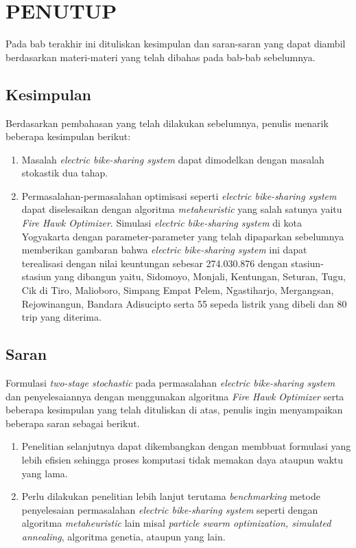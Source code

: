 \chapter{PENUTUP}

Pada bab terakhir ini dituliskan kesimpulan dan saran-saran yang dapat diambil berdasarkan materi-materi yang telah dibahas pada bab-bab sebelumnya.

\section{Kesimpulan}
Berdasarkan pembahasan yang telah dilakukan sebelumnya, penulis menarik beberapa kesimpulan berikut:
\begin{enumerate}
    \item Masalah \textit{electric bike-sharing system} dapat dimodelkan dengan masalah stokastik dua tahap.
    \item Permasalahan-permasalahan optimisasi seperti \textit{electric bike-sharing system} dapat diselesaikan dengan algoritma \textit{metaheuristic} yang salah satunya yaitu \textit{Fire Hawk Optimizer}. Simulasi \textit{electric bike-sharing system} di kota Yogyakarta dengan parameter-parameter yang telah dipaparkan sebelumnya memberikan gambaran bahwa \textit{electric bike-sharing system} ini dapat terealisasi dengan nilai keuntungan sebesar 274.030.876 dengan stasiun-stasiun yang dibangun yaitu, Sidomoyo, Monjali, Kentungan, Seturan, Tugu, Cik di Tiro, Malioboro, Simpang Empat Pelem, Ngastiharjo, Mergangsan, Rejowinangun, Bandara Adisucipto serta 55 sepeda listrik yang dibeli dan 80 trip yang diterima.
\end{enumerate}

\section{Saran}
Formulasi \textit{two-stage stochastic} pada permasalahan \textit{electric bike-sharing system} dan penyelesaiannya dengan menggunakan algoritma \textit{Fire Hawk Optimizer} serta beberapa kesimpulan yang telah dituliskan di atas,  penulis ingin menyampaikan beberapa saran sebagai berikut.
\begin{enumerate}
    \item Penelitian selanjutnya dapat dikembangkan dengan membbuat formulasi yang lebih efisien sehingga proses komputasi tidak memakan daya ataupun waktu yang lama.
    \item Perlu dilakukan penelitian lebih lanjut terutama \textit{benchmarking} metode penyelesaian permasalahan \textit{electric bike-sharing system} seperti dengan algoritma \textit{metaheuristic} lain misal \textit{particle swarm optimization, simulated annealing}, algoritma genetia, ataupun yang lain.
\end{enumerate}